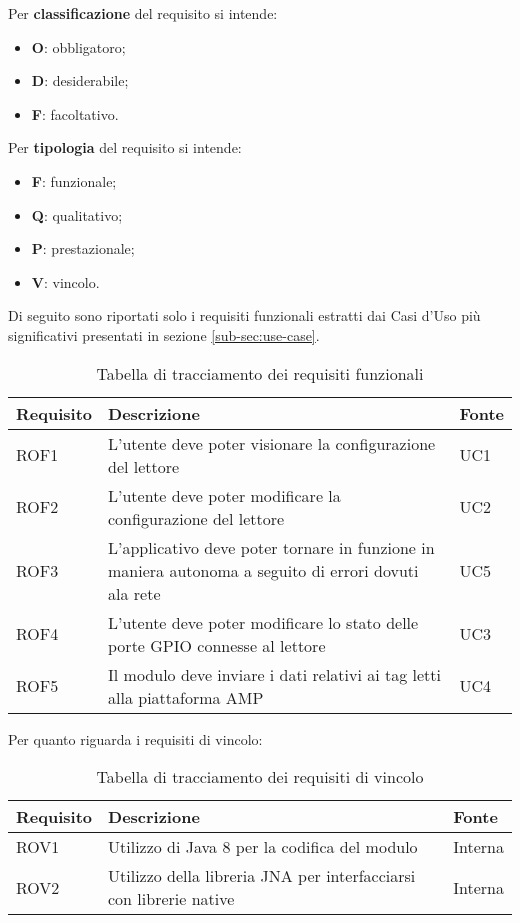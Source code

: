Per \textbf{classificazione} del requisito si intende:
\begin{itemize}
    \item \textbf{O}: obbligatoro;
    \item \textbf{D}: desiderabile;
    \item \textbf{F}: facoltativo.
\end{itemize}

Per \textbf{tipologia} del requisito si intende:
\begin{itemize}
    \item \textbf{F}: funzionale;
    \item \textbf{Q}: qualitativo;
    \item \textbf{P}: prestazionale;
    \item \textbf{V}: vincolo.
\end{itemize}

Di seguito sono riportati solo i requisiti funzionali estratti dai Casi d'Uso più significativi presentati in sezione \ref{sub-sec:use-case}.
\begin{table}
    \label{tab:requisiti-fun}
    \begin{tabularx}{\textwidth}{ | X | X | X |}
    \hline
    \textbf{Requisito} & \textbf{Descrizione} & \textbf{Fonte}\\
    \hline
    ROF1 & L'utente deve poter visionare la configurazione del lettore & UC1 \\
    \hline
    ROF2 & L'utente deve poter modificare la configurazione del lettore & UC2 \\
    \hline
    ROF3 & L'applicativo deve poter tornare in funzione in maniera autonoma a seguito di errori dovuti ala rete & UC5 \\
    \hline
    ROF4 & L'utente deve poter modificare lo stato delle porte GPIO connesse al lettore & UC3 \\
    \hline
    ROF5 & Il modulo deve inviare i dati relativi ai tag letti alla piattaforma AMP & UC4 \\
    \hline
    \end{tabularx}
    \caption{Tabella di tracciamento dei requisiti funzionali}
\end{table}

Per quanto riguarda i requisiti di vincolo:
\begin{table}
    \label{tab:requisiti-vinc}
    \begin{tabularx}{\textwidth}{ | X | X | X |}
    \hline
    \textbf{Requisito} & \textbf{Descrizione} & \textbf{Fonte}\\
    \hline
    ROV1 & Utilizzo di Java 8 per la codifica del modulo & Interna \\
    \hline
    ROV2 & Utilizzo della libreria JNA per interfacciarsi con librerie native & Interna \\
    \hline
    \end{tabularx}
    \caption{Tabella di tracciamento dei requisiti di vincolo}
\end{table}

